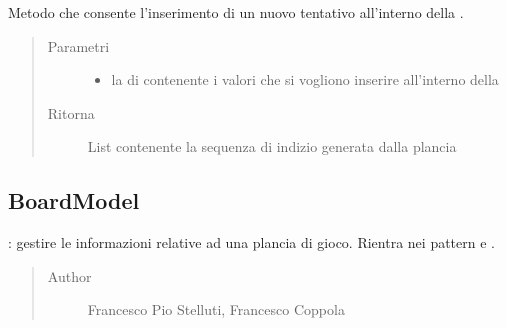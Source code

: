\documentclass[letterpaper,10pt,italian,openany,oneside]{sphinxmanual}
\begin{document}
\begin{fulllineitems}
\label{\detokenize{source/it/unicam/cs/pa/mastermind/gamecore/BoardController:it.unicam.cs.pa.mastermind.gamecore.BoardController.insertNewAttempt(List)}}
Metodo che consente l’inserimento di un nuovo tentativo all’interno della .
\begin{quote}\begin{description}
\item[{Parametri}] \leavevmode\begin{itemize}
\item {} 
 \textendash{} la  di  contenente i valori che si vogliono inserire all’interno della 

\end{itemize}

\item[{Ritorna}] \leavevmode
List contenente la sequenza di  indizio generata dalla plancia

\end{description}\end{quote}

\end{fulllineitems}



\subsection{BoardModel}
\label{\detokenize{source/it/unicam/cs/pa/mastermind/gamecore/BoardModel:boardmodel}}\label{\detokenize{source/it/unicam/cs/pa/mastermind/gamecore/BoardModel::doc}}

\begin{fulllineitems}
\label{\detokenize{source/it/unicam/cs/pa/mastermind/gamecore/BoardModel:it.unicam.cs.pa.mastermind.gamecore.BoardModel}}
: gestire le informazioni relative ad una plancia di gioco. Rientra nei pattern  e .
\begin{quote}\begin{description}
\item[{Author}] \leavevmode
Francesco Pio Stelluti, Francesco Coppola

\end{description}\end{quote}

\end{fulllineitems}
\end{document}
